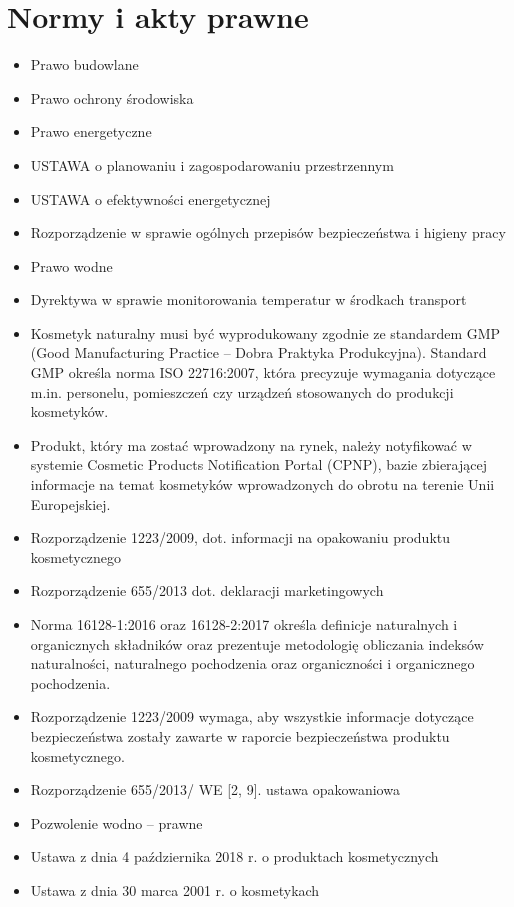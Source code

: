 \section{Normy i akty prawne}

\begin{itemize}
	\item Prawo budowlane
	\item Prawo ochrony środowiska
	\item Prawo energetyczne
	\item USTAWA o planowaniu i zagospodarowaniu przestrzennym
	\item USTAWA o efektywności energetycznej
	\item Rozporządzenie w sprawie ogólnych przepisów bezpieczeństwa i higieny pracy
	\item Prawo wodne
	\item Dyrektywa w sprawie monitorowania temperatur w środkach transport
	\item Kosmetyk naturalny musi być wyprodukowany zgodnie ze standardem GMP (Good Manufacturing Practice – Dobra Praktyka Produkcyjna). Standard GMP określa norma ISO 22716:2007, która precyzuje wymagania dotyczące m.in. personelu, pomieszczeń czy urządzeń stosowanych do produkcji kosmetyków.
	\item Produkt, który ma zostać wprowadzony na rynek, należy notyfikować w systemie Cosmetic Products Notification Portal (CPNP), bazie zbierającej informacje na temat kosmetyków wprowadzonych do obrotu na terenie Unii Europejskiej.
	\item Rozporządzenie 1223/2009, dot. informacji na opakowaniu produktu kosmetycznego
	\item Rozporządzenie 655/2013 dot. deklaracji marketingowych
	\item Norma 16128-1:2016 oraz 16128-2:2017 określa definicje naturalnych i organicznych składników oraz prezentuje metodologię obliczania indeksów naturalności, naturalnego pochodzenia oraz organiczności i organicznego pochodzenia.
	\item Rozporządzenie 1223/2009 wymaga, aby wszystkie informacje dotyczące bezpieczeństwa zostały zawarte w raporcie bezpieczeństwa produktu kosmetycznego.
	\item Rozporządzenie 655/2013/ WE [2, 9].  ustawa opakowaniowa
	\item Pozwolenie wodno – prawne
	\item Ustawa z dnia 4 października 2018 r. o produktach kosmetycznych
	\item Ustawa z dnia 30 marca 2001 r. o kosmetykach

\end{itemize}
